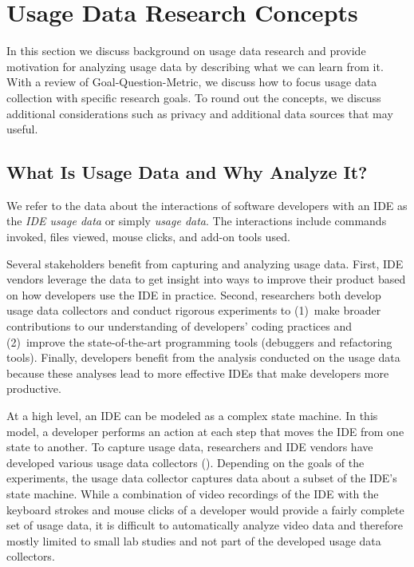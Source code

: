 \section{Usage Data Research Concepts}

In this section we discuss background on usage data research and provide motivation for analyzing usage data by describing what we can learn from it.  With a review of Goal-Question-Metric, we discuss how to focus usage data collection with specific research goals.  To round out the concepts, we discuss additional considerations such as privacy and additional data sources that may useful.

\subsection{What Is Usage Data and Why Analyze It?}

We refer to the data about the interactions of software developers with an IDE as the
\emph{IDE usage data} or simply \emph{usage data}.  The interactions include commands invoked, files viewed, mouse clicks, and add-on tools used.

%
Several stakeholders benefit from capturing and analyzing usage data. First, IDE
vendors leverage the data to get insight into ways to improve their product
based on how developers use the IDE in practice. Second, researchers both
develop usage data collectors and conduct rigorous experiments to (1)~make
broader contributions to our understanding of developers' coding practices and
(2)~improve the state-of-the-art programming tools (\eg debuggers and
refactoring tools). Finally, developers benefit from the analysis conducted on
the usage data because these analyses lead to more effective IDEs that make
developers more productive.

At a high level, an IDE can be modeled as a complex state machine. In this
model, a developer performs an action at each step that moves the IDE from one state
to another.
To capture usage data, researchers and IDE vendors have
developed various usage data collectors ().
Depending on the goals of the experiments, the usage data collector captures
data about a subset of the IDE's state machine. While a combination of video recordings of the IDE with the keyboard strokes and mouse clicks of a developer would provide a fairly complete set of usage data, it is difficult to automatically analyze video data and therefore mostly limited to small lab studies and not part of the developed usage data collectors.


